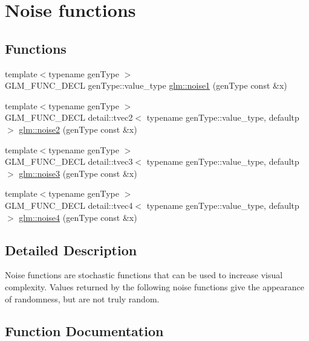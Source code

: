 \hypertarget{group__core__func__noise}{}\section{Noise functions}
\label{group__core__func__noise}
\subsection*{Functions}
\begin{DoxyCompactItemize}
\item 
{\footnotesize template$<$typename gen\+Type $>$ }\\G\+L\+M\+\_\+\+F\+U\+N\+C\+\_\+\+D\+E\+CL gen\+Type\+::value\+\_\+type \hyperlink{group__core__func__noise_gadcbf14e3390990f33fda02bb20836960}{glm\+::noise1} (gen\+Type const \&x)
\item 
{\footnotesize template$<$typename gen\+Type $>$ }\\G\+L\+M\+\_\+\+F\+U\+N\+C\+\_\+\+D\+E\+CL detail\+::tvec2$<$ typename gen\+Type\+::value\+\_\+type, defaultp $>$ \hyperlink{group__core__func__noise_ga876ad0805cece7b52bac9f5bac42647a}{glm\+::noise2} (gen\+Type const \&x)
\item 
{\footnotesize template$<$typename gen\+Type $>$ }\\G\+L\+M\+\_\+\+F\+U\+N\+C\+\_\+\+D\+E\+CL detail\+::tvec3$<$ typename gen\+Type\+::value\+\_\+type, defaultp $>$ \hyperlink{group__core__func__noise_gadc066dd8e6c25b77a0dd4f59d4a2dd2c}{glm\+::noise3} (gen\+Type const \&x)
\item 
{\footnotesize template$<$typename gen\+Type $>$ }\\G\+L\+M\+\_\+\+F\+U\+N\+C\+\_\+\+D\+E\+CL detail\+::tvec4$<$ typename gen\+Type\+::value\+\_\+type, defaultp $>$ \hyperlink{group__core__func__noise_ga4ca7d36395a06c2f210ceca5d9a1d020}{glm\+::noise4} (gen\+Type const \&x)
\end{DoxyCompactItemize}


\subsection{Detailed Description}
Noise functions are stochastic functions that can be used to increase visual complexity. Values returned by the following noise functions give the appearance of randomness, but are not truly random. 

\subsection{Function Documentation}
